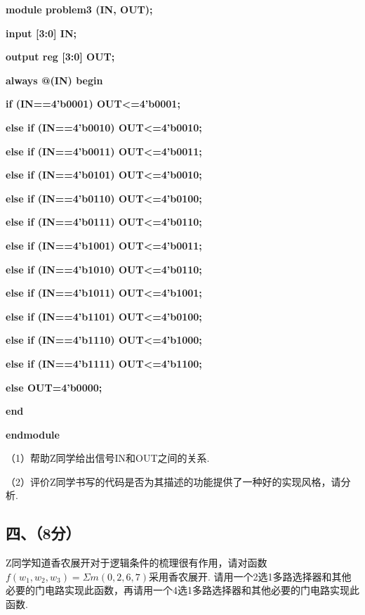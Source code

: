 \documentclass{ctexart}
\begin{document}
{\small
\qquad \textbf{module problem3 (IN, OUT);}\par
   \qquad \qquad \textbf{input [3:0] IN;}\par
   \qquad \qquad \textbf{output reg [3:0] OUT;}\par
\qquad    \qquad \textbf{always @(IN) begin}\par
\qquad    \qquad \qquad      \textbf{if (IN==4'b0001)   OUT<=4'b0001;}\par
\qquad    \qquad \qquad      \textbf{else if (IN==4'b0010) OUT<=4'b0010;}\par
\qquad    \qquad \qquad      \textbf{else if (IN==4'b0011) OUT<=4'b0011;}\par
\qquad    \qquad \qquad      \textbf{else if (IN==4'b0101) OUT<=4'b0010;}\par
\qquad    \qquad \qquad      \textbf{else if (IN==4'b0110) OUT<=4'b0100;}\par
\qquad    \qquad \qquad      \textbf{else if (IN==4'b0111) OUT<=4'b0110;}\par
\qquad    \qquad \qquad      \textbf{else if (IN==4'b1001) OUT<=4'b0011;}\par
\qquad    \qquad \qquad      \textbf{else if (IN==4'b1010) OUT<=4'b0110;}\par
\qquad    \qquad \qquad      \textbf{else if (IN==4'b1011) OUT<=4'b1001;}\par
\qquad    \qquad \qquad      \textbf{else if (IN==4'b1101) OUT<=4'b0100;}\par
\qquad    \qquad \qquad      \textbf{else if (IN==4'b1110) OUT<=4'b1000;}\par
\qquad     \qquad \qquad     \textbf{else if (IN==4'b1111) OUT<=4'b1100;}\par
\qquad    \qquad \qquad      \textbf{else OUT=4'b0000;}\par
\qquad  \qquad \textbf{end} \par
\qquad     \textbf{endmodule}\par
}
（1）帮助Z同学给出信号IN和OUT之间的关系. \par
（2）评价Z同学书写的代码是否为其描述的功能提供了一种好的实现风格，请分析.
\vspace{4.2cm}

\subsection*{四、（8分）}
Z同学知道香农展开对于逻辑条件的梳理很有作用，请对函数$f(w_1,w_2,w_3)=\Sigma m(0,2,6,7)$采用香农展开. 请用一个2选1多路选择器和其他必要的门电路实现此函数，再请用一个4选1多路选择器和其他必要的门电路实现此函数.
\end{document}

